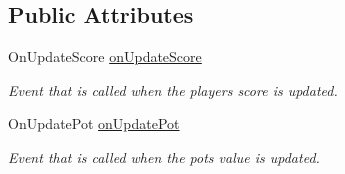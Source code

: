 \subsection*{Public Attributes}
\begin{DoxyCompactItemize}
\item 
On\+Update\+Score \hyperlink{class_score_manager_a54ededdc900a0c1982c25ab9ca984bed}{on\+Update\+Score}
\begin{DoxyCompactList}\small\item\em Event that is called when the player\textquotesingle{}s score is updated. \end{DoxyCompactList}\item 
On\+Update\+Pot \hyperlink{class_score_manager_a2df09d1f61b32b83a80c78d63f94689b}{on\+Update\+Pot}
\begin{DoxyCompactList}\small\item\em Event that is called when the pot\textquotesingle{}s value is updated. \end{DoxyCompactList}\end{DoxyCompactItemize}
